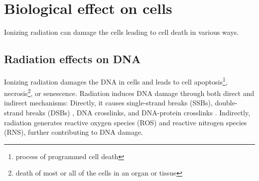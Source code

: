





\section{Biological effect on cells}
Ionizing radiation can damage the cells leading to cell death in various ways.

\subsection{Radiation effects on DNA}
Ionizing radiation damages the DNA \cite{Scholes2014} in cells and leads to cell apoptosis\footnote{process of programmed cell death}, necrosis\footnote{death of most or all of the cells in an organ or tissue}, or senescence.
Radiation induces DNA damage through both direct and indirect mechanisms:
Directly, it causes single-strand breaks (SSBs), double-strand breaks (DSBs) \cite{Roots1985}, DNA crosslinks, and DNA-protein crosslinks \cite{Nakano2017}.
Indirectly, radiation generates reactive oxygen species (ROS) and reactive nitrogen species (RNS), further contributing to DNA damage.

